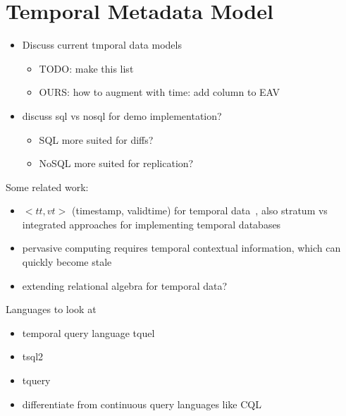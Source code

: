 \section{Temporal Metadata Model}

\begin{itemize}
\item Discuss current tmporal data models
    \begin{itemize}
    \item TODO: make this list
    \item OURS: how to augment with time: add column to EAV
    \end{itemize}
\item discuss sql vs nosql for demo implementation?
    \begin{itemize}
    \item SQL more suited for diffs?
    \item NoSQL more suited for replication?
    \end{itemize}
\end{itemize}

Some related work:
\begin{itemize}
\item $<tt, vt>$ (timestamp, validtime) for temporal data~\cite{jensen1999temporal},
also stratum vs integrated approaches for implementing temporal databases
\item pervasive computing requires temporal contextual information, which
can quickly become stale~\cite{henricksen2002modeling}
\item extending relational algebra for temporal data?~\cite{lorentzos1988extending}
\end{itemize}
Languages to look at
\begin{itemize}
\item temporal query language tquel~\cite{snodgrass1987temporal}
\item tsql2~\cite{snodgrass2012tsql2}
\item tquery~\cite{kahn1991tquery}
\item differentiate from continuous query languages like CQL~\cite{arasu2006cql}
\end{itemize}

